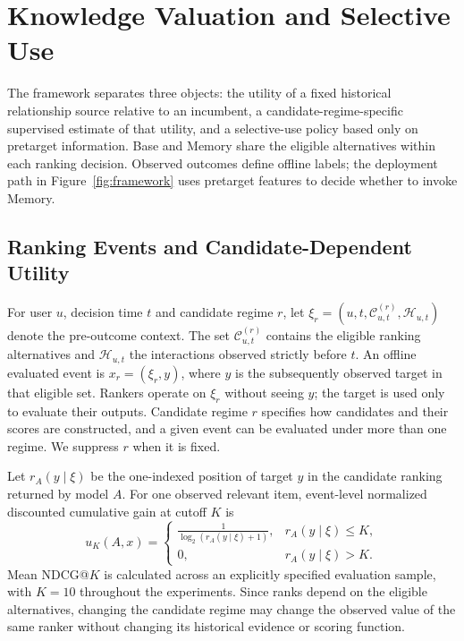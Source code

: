 \section{Knowledge Valuation and Selective Use}
\label{sec:problem}
\label{sec:framework}

The framework separates three objects: the utility of a fixed historical relationship source relative to an incumbent, a candidate-regime-specific supervised estimate of that utility, and a selective-use policy based only on pretarget information. Base and Memory share the eligible alternatives within each ranking decision. Observed outcomes define offline labels; the deployment path in Figure~\ref{fig:framework} uses pretarget features to decide whether to invoke Memory.

\subsection{Ranking Events and Candidate-Dependent Utility}
\label{sec:event-utility}

For user $u$, decision time $t$ and candidate regime $r$, let $\xi_r=(u,t,\mathcal{C}^{(r)}_{u,t},\mathcal{H}_{u,t})$ denote the pre-outcome context. The set $\mathcal{C}^{(r)}_{u,t}$ contains the eligible ranking alternatives and $\mathcal{H}_{u,t}$ the interactions observed strictly before $t$. An offline evaluated event is $x_r=(\xi_r,y)$, where $y$ is the subsequently observed target in that eligible set. Rankers operate on $\xi_r$ without seeing $y$; the target is used only to evaluate their outputs. Candidate regime $r$ specifies how candidates and their scores are constructed, and a given event can be evaluated under more than one regime. We suppress $r$ when it is fixed.

Let $r_A(y\mid\xi)$ be the one-indexed position of target $y$ in the candidate ranking returned by model $A$. For one observed relevant item, event-level normalized discounted cumulative gain at cutoff $K$ is
\begin{equation}
    u_K(A,x)=
    \begin{cases}
        \displaystyle \frac{1}{\log_2\!\left(r_A(y\mid\xi)+1\right)}, & r_A(y\mid\xi)\le K,\\[6pt]
        0, & r_A(y\mid\xi)>K.
    \end{cases}
    \label{eq:event-ndcg}
\end{equation}
Mean NDCG@$K$ is calculated across an explicitly specified evaluation sample, with $K=10$ throughout the experiments. Since ranks depend on the eligible alternatives, changing the candidate regime may change the observed value of the same ranker without changing its historical evidence or scoring function.

